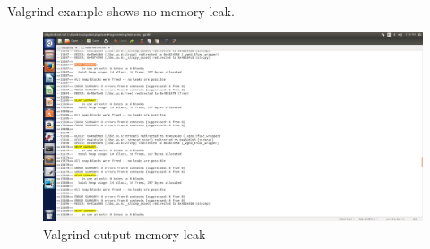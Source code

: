 \documentclass{article}
\begin{document}
\\ 
Valgrind example shows no memory leak.
\begin{figure}[h!]
\centering
\includegraphics[scale=0.3]{valgrindHeap.png}
\caption{Valgrind output memory leak}
\label{fig:citizen}
\end{figure}
\end{document}
